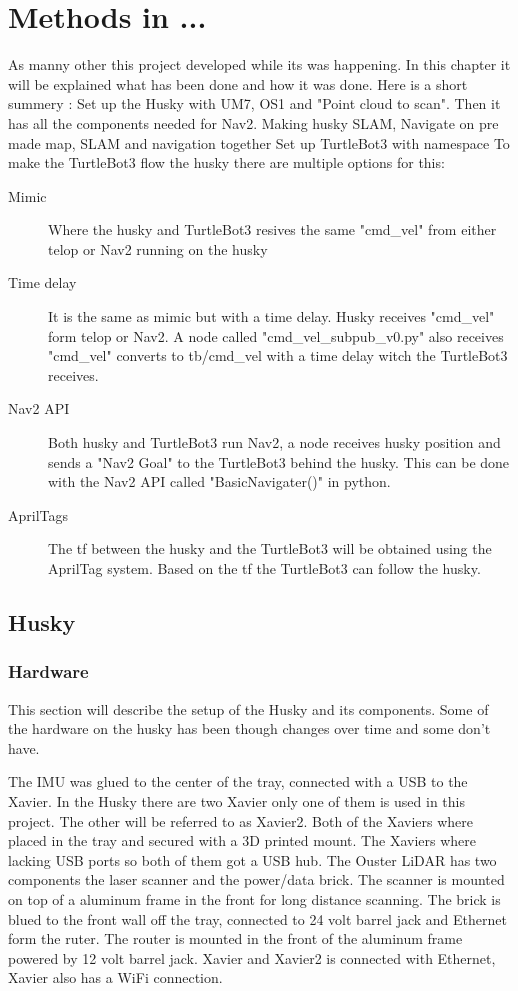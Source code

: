 \chapter{Methods in ...}

As manny other  this project developed while its was happening. In this chapter it will be explained what has been done and how it was done. Here is a short summery : 
Set up the Husky with UM7, OS1 and "Point cloud to scan". Then it has all the components needed for Nav2. 
Making husky SLAM, Navigate on pre made map, SLAM and navigation together 
Set up TurtleBot3 with namespace 
To make the TurtleBot3 flow the husky there are multiple options for this: 

\begin{description}
   \item[Mimic] Where the husky and TurtleBot3 resives the same "cmd\_vel" from either telop or Nav2 running on the husky
   \item[Time delay] It is the same as mimic but with a time delay. Husky receives "cmd\_vel" form telop or Nav2. A node called "cmd\_vel\_subpub\_v0.py" also receives "cmd\_vel" converts to tb/cmd\_vel with a time delay witch the TurtleBot3 receives. 
   \item[Nav2 API] Both husky and TurtleBot3 run Nav2, a node receives husky position and sends a "Nav2 Goal" to the TurtleBot3 behind the husky. This can be done with the Nav2 API called "BasicNavigater()" in python.
   \item[AprilTags] The tf between the husky and the TurtleBot3 will be obtained using the AprilTag system. Based on the tf the TurtleBot3 can follow the husky. 
\end{description}


\section{Husky}
\subsection{Hardware}
This section will describe the setup of the Husky and its components. Some of the hardware on the husky has been though changes over time and some don't have. 

The IMU was glued to the center of the tray, connected with a USB to the Xavier. In the Husky there are two Xavier only one of them is used in this project. The other will be referred to as Xavier2. Both of the Xaviers where placed in the tray and secured with a 3D printed mount. The Xaviers where lacking USB ports so both of them got a USB hub. 
The Ouster LiDAR has two components the laser scanner and the power/data brick. The scanner is mounted on top of a aluminum frame in the front for long distance scanning. The brick is blued to the front wall off the tray, connected to 24 volt barrel jack and Ethernet form the ruter. 
The router is mounted in the front of the aluminum frame powered by 12 volt barrel jack. Xavier and Xavier2 is connected with Ethernet, Xavier also has a WiFi connection. 

